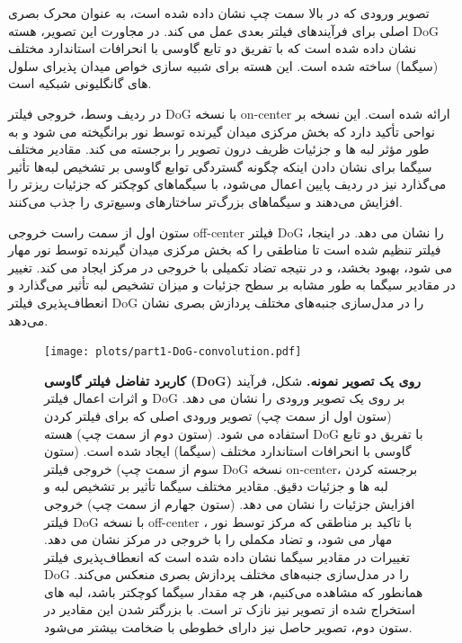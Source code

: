             تصویر ورودی که در بالا سمت چپ نشان داده شده است، به عنوان محرک بصری اصلی برای فرآیندهای فیلتر بعدی عمل می کند. در مجاورت این تصویر، هسته 
            DoG 
            نشان داده شده است که با تفریق دو تابع گاوسی با انحرافات استاندارد مختلف 
            (سیگما) 
            ساخته شده است. این هسته برای شبیه سازی خواص میدان پذیرای سلول های گانگلیونی شبکیه است.

            در ردیف وسط، خروجی فیلتر 
            DoG 
            با نسخه
            on-center
            ارائه شده است. این نسخه بر نواحی تأکید دارد که بخش مرکزی میدان گیرنده توسط نور برانگیخته می شود و به طور مؤثر لبه ها و جزئیات ظریف درون تصویر را برجسته می کند. مقادیر مختلف سیگما برای نشان دادن اینکه چگونه گستردگی توابع گاوسی بر تشخیص لبه‌ها تأثیر می‌گذارد نیز در ردیف پایین اعمال می‌شود، با سیگماهای کوچکتر که جزئیات ریزتر را افزایش می‌دهند و سیگماهای بزرگ‌تر ساختارهای وسیع‌تری را جذب می‌کنند.

            ستون اول از سمت راست خروجی 
            off-center
            فیلتر 
            DoG 
            را نشان می دهد. در اینجا، فیلتر تنظیم شده است تا مناطقی را که بخش مرکزی میدان گیرنده توسط نور مهار می شود، بهبود بخشد، و در نتیجه تضاد تکمیلی با خروجی در مرکز ایجاد می کند. تغییر در مقادیر سیگما به طور مشابه بر سطح جزئیات و میزان تشخیص لبه تأثیر می‌گذارد و انعطاف‌پذیری فیلتر 
            DoG 
            را در مدل‌سازی جنبه‌های مختلف پردازش بصری نشان می‌دهد.

            \begin{figure}[!ht]
                \centering
                \texttt{[image: plots/part1-DoG-convolution.pdf]} 
                \captionsetup{width=.9\linewidth}
                \caption{\textbf{کاربرد تفاضل فیلتر گاوسی 
                (DoG) 
                روی یک تصویر نمونه.} 
                شکل، فرآیند و اثرات اعمال فیلتر 
                DoG 
                بر روی یک تصویر ورودی را نشان می دهد. 
                (ستون اول از سمت چپ) 
                تصویر ورودی اصلی که برای فیلتر کردن استفاده می شود. 
                (ستون دوم از سمت چپ) 
                هسته 
                DoG 
                با تفریق دو تابع گاوسی با انحرافات استاندارد مختلف (سیگما) 
                ایجاد شده است. 
                (ستون سوم از سمت چپ) 
                خروجی فیلتر 
                DoG 
                نسخه 
                on-center، 
                برجسته کردن لبه ها و جزئیات دقیق. مقادیر مختلف سیگما تأثیر بر تشخیص لبه و افزایش جزئیات را نشان می دهد. 
                (ستون جهارم از سمت چپ) 
                خروجی فیلتر 
                DoG 
                با نسخه
                off-center
                ، با تاکید بر مناطقی که مرکز توسط نور مهار می شود، و تضاد مکملی را با خروجی در مرکز نشان می دهد. تغییرات در مقادیر سیگما نشان داده شده است که انعطاف‌پذیری فیلتر 
                DoG 
                را در مدل‌سازی جنبه‌های مختلف پردازش بصری منعکس می‌کند.
                همانطور که مشاهده می‌کنیم، هر چه مقدار سیگما کوچکتر باشد، لبه های استخراج شده از تصویر نیز نازک تر است. با بزرگتر شدن این مقادیر در ستون دوم، تصویر حاصل نیز دارای خطوطی با ضخامت بیشتر می‌شود. }
                \label{fig:part1-DoG-on-image}
            \end{figure}

